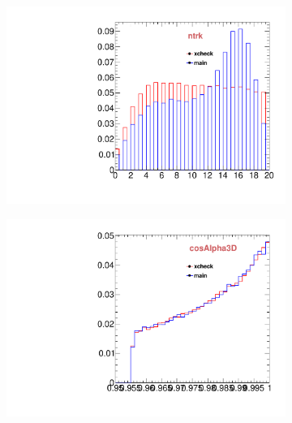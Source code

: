\begin{figure}
        \centering
        \begin{subfigure}[b]{0.2\textwidth}
                \centering
                \includegraphics[width=\textwidth]{Figures/VariablesComparison/Data_barrel_figs/closetrk}
                \label{fig:Data_barrel_closetrk}
        \end{subfigure}
        \begin{subfigure}[b]{0.2\textwidth}
                \centering
                \includegraphics[width=\textwidth]{Figures/VariablesComparison/Data_barrel_figs/cosa}
                \label{fig:Data_barrel_cosa}
        \end{subfigure}
        \begin{subfigure}[b]{0.2\textwidth}
                \centering

\end{subfigure}
\end{figure}
